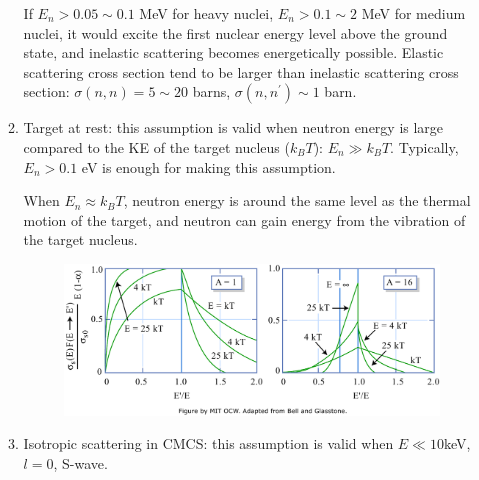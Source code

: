 \documentclass{school-22.101-notes}
\begin{document}
\begin{enumerate}
\begin{enumerate}
If $E_n > 0.05 \sim 0.1$ MeV for heavy nuclei, $E_n > 0.1 \sim 2$ MeV for medium nuclei, it would excite the first nuclear energy level above the ground state, and inelastic scattering becomes energetically possible. Elastic scattering cross section tend to be larger than inelastic scattering cross section: $\sigma (n,n) = 5\sim20$ barns, $\sigma(n,n^{\prime}) \sim 1$ barn.

\item Target at rest: this assumption is valid when neutron energy is large compared to the KE of the target nucleus ($k_B T$): $E_n \gg k_B T$. Typically, $E_n > 0.1$ eV is enough for making this assumption. 

When $E_n \approx k_B T$, neutron energy is around the same level as the thermal motion of the target, and neutron can gain energy from the vibration of the target nucleus. 
\begin{figure}
    \centering
    \includegraphics[width=4in]{images/ni/lower-neutron-energy.png}
\end{figure}

\item Isotropic scattering in CMCS: this assumption is valid when $E \ll 10 $keV, $l=0$, S-wave. 


\end{enumerate}
\end{enumerate}
\end{document}

